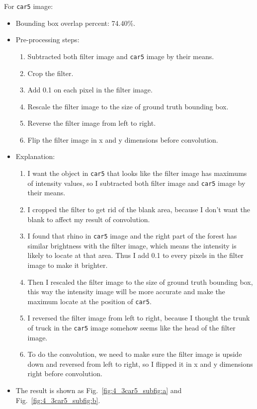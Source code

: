 \documentclass{assignment}
\begin{document}
\begin{problemlist}
For \texttt{car5} image:
\begin{itemize}
    \item Bounding box overlap percent: 74.40\%.
    \item Pre-processing steps: 
    \begin{enumerate}[label={\alph*)}]
        \item Subtracted both filter image and \texttt{car5} image by their means.
        \item Crop the filter.
        \item Add 0.1 on each pixel in the filter image.
        \item Rescale the filter image to the size of ground truth bounding box.
        \item Reverse the filter image from left to right.
        \item Flip the filter image in x and y dimensions before convolution.
    \end{enumerate}
    \item Explanation: 
    \begin{enumerate}[label={\alph*)}]
        \item I want the object in \texttt{car5} that looks like the filter image has maximums of intensity values, so I subtracted both filter image and \texttt{car5} image by their means.
        \item I cropped the filter to get rid of the blank area, because I don't want the blank to affect my result of convolution.
        \item I found that rhino in \texttt{car5} image and the right part of the forest has similar brightness with the filter image, which means the intensity is likely to locate at that area. Thus I add 0.1 to every pixels in the filter image to make it brighter.
        \item Then I rescaled the filter image to the size of ground truth bounding box, this way the intensity image will be more accurate and make the maximum locate at the position of \texttt{car5}.
        \item I reversed the filter image from left to right, because I thought the trunk of truck in the \texttt{car5} image somehow seems like the head of the filter image.
        \item To do the convolution, we need to make sure the filter image is upside down and reversed from left to right, so I flipped it in x and y dimensions right before convolution.
    \end{enumerate}
    \item The result is shown as Fig.~\ref{fig:4_3car5_subfig:a} and Fig.~\ref{fig:4_3car5_subfig:b}.
\end{itemize}


\end{problemlist}
\end{document}
